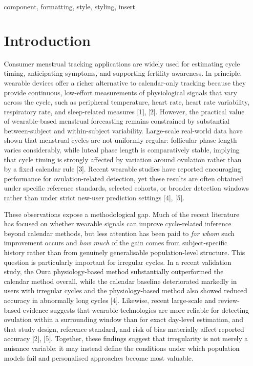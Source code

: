 \documentclass[conference]{IEEEtran}
\begin{document}
\begin{IEEEkeywords}
component, formatting, style, styling, insert
\end{IEEEkeywords}

\section{Introduction}

Consumer menstrual tracking applications are widely used for estimating cycle timing, anticipating symptoms, and supporting fertility awareness. In principle, wearable devices offer a richer alternative to calendar-only tracking because they provide continuous, low-effort measurements of physiological signals that vary across the cycle, such as peripheral temperature, heart rate, heart rate variability, respiratory rate, and sleep-related measures [1], [2]. However, the practical value of wearable-based menstrual forecasting remains constrained by substantial between-subject and within-subject variability. Large-scale real-world data have shown that menstrual cycles are not uniformly regular: follicular phase length varies considerably, while luteal phase length is comparatively stable, implying that cycle timing is strongly affected by variation around ovulation rather than by a fixed calendar rule [3]. Recent wearable studies have reported encouraging performance for ovulation-related detection, yet these results are often obtained under specific reference standards, selected cohorts, or broader detection windows rather than under strict new-user prediction settings [4], [5].

These observations expose a methodological gap. Much of the recent literature has focused on whether wearable signals can improve cycle-related inference beyond calendar methods, but less attention has been paid to \emph{for whom} such improvement occurs and \emph{how much} of the gain comes from subject-specific history rather than from genuinely generalisable population-level structure. This question is particularly important for irregular cycles. In a recent validation study, the Oura physiology-based method substantially outperformed the calendar method overall, while the calendar baseline deteriorated markedly in users with irregular cycles and the physiology-based method also showed reduced accuracy in abnormally long cycles [4]. Likewise, recent large-scale and review-based evidence suggests that wearable technologies are more reliable for detecting ovulation within a surrounding window than for exact day-level estimation, and that study design, reference standard, and risk of bias materially affect reported accuracy [2], [5]. Together, these findings suggest that irregularity is not merely a nuisance variable: it may instead define the conditions under which population models fail and personalised approaches become most valuable.
\end{document}
